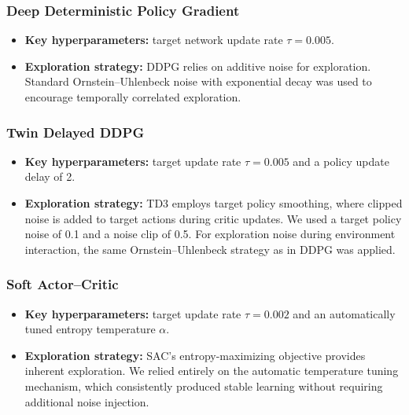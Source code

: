 \documentclass[]{interact}
\begin{document}
\subsubsection{Deep Deterministic Policy Gradient}

\begin{itemize}

    \item \textbf{Key hyperparameters:} target network update rate $\tau = 0.005$.
    \item \textbf{Exploration strategy:} DDPG relies on additive noise for exploration. Standard Ornstein--Uhlenbeck noise with exponential decay was used to encourage temporally correlated exploration.
\end{itemize}

\subsubsection{Twin Delayed DDPG}

\begin{itemize}

    \item \textbf{Key hyperparameters:} target update rate $\tau = 0.005$ and a policy update delay of 2.
    \item \textbf{Exploration strategy:} TD3 employs target policy smoothing, where clipped noise is added to target actions during critic updates. We used a target policy noise of 0.1 and a noise clip of 0.5. For exploration noise during environment interaction, the same Ornstein--Uhlenbeck strategy as in DDPG was applied.
\end{itemize}

\subsubsection{Soft Actor--Critic}

\begin{itemize}

    \item \textbf{Key hyperparameters:} target update rate $\tau = 0.002$ and an automatically tuned entropy temperature $\alpha$.
    \item \textbf{Exploration strategy:} SAC’s entropy-maximizing objective provides inherent exploration. We relied entirely on the automatic temperature tuning mechanism, which consistently produced stable learning without requiring additional noise injection.
\end{itemize}
\end{document}
